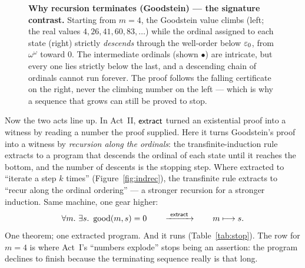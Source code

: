 \documentclass[11pt]{article}
\begin{document}
\begin{figure}[h]
\centering
{}
\caption{\textbf{Why recursion terminates (Goodstein) --- the signature
contrast.} Starting from $m=4$, the Goodstein value climbs (left; the real
values $4,26,41,60,83,\dots$) while the ordinal assigned to each state (right)
strictly \emph{descends} through the well-order below $\varepsilon_0$, from
$\omega^{\omega}$ toward $0$. The intermediate ordinals (shown $\bullet$) are
intricate, but every one lies strictly below the last, and a descending chain of
ordinals cannot run forever. The proof follows the falling certificate on the
right, never the climbing number on the left --- which is why a sequence that
grows can still be proved to stop.}
\label{fig:ordinals}
\end{figure}

Now the two acts line up. In Act~II, $\mathsf{extract}$ turned an existential proof into
a witness by reading a number the proof supplied. Here it turns Goodstein's
proof into a witness by \emph{recursion along the ordinals}: the
transfinite-induction rule extracts to a program that descends the ordinal of
each state until it reaches the bottom, and the number of descents is the
stopping step. Where  extracted to ``iterate a step $k$ times''
(Figure~\ref{fig:indrec}), the transfinite rule extracts to ``recur along the
ordinal ordering'' --- a stronger recursion for a stronger induction. Same
machine, one gear higher:
\[
  \forall m.\ \exists s.\ \operatorname{good}(m,s)=0
  \qquad\xrightarrow{\ \mathsf{extract}\ }\qquad
  m \longmapsto s .
\]
One theorem; one extracted program. And it runs (Table~\ref{tab:stop}). The row
for $m=4$ is where Act~I's ``numbers explode'' stops being an assertion: the
program declines to finish because the terminating sequence really is that
long.
\end{document}
